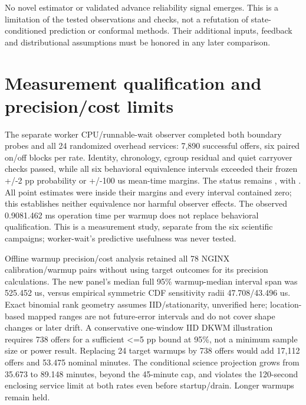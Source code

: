 \documentclass[11pt,a4paper]{article}
\begin{document}
No novel estimator or validated advance reliability signal emerges. This is
a limitation of the tested observations and checks, not a refutation of
state-conditioned prediction or conformal methods. Their additional inputs,
feedback and distributional assumptions must be honored in any later comparison.

\section{Measurement qualification and precision/cost limits}

The separate worker CPU/runnable-wait observer completed both boundary probes
and all 24 randomized overhead services: 7,890 successful offers, six paired
on/off blocks per rate. Identity, chronology, cgroup residual and quiet carryover
checks passed, while all six behavioral equivalence intervals exceeded their
frozen +/-2 pp probability or +/-100 us mean-time margins. The status remains
, with .
All point estimates were inside their margins and every interval contained zero;
this establishes neither equivalence nor harmful observer effects. The observed
0.908\textendash{}1.462 ms operation time per warmup does not replace behavioral qualification.
This is a measurement study, separate from the six scientific campaigns;
worker-wait's predictive usefulness was never tested.

Offline warmup precision/cost analysis retained all 78 NGINX calibration/warmup
pairs without using target outcomes for its precision calculations. The new
panel's median full 95\% warmup-median interval span was 525.452 us, versus
empirical symmetric CDF sensitivity radii 47.708/43.496 us. Exact binomial
rank geometry assumes IID/stationarity, unverified here; location-based mapped
ranges are not future-error intervals and do not cover shape changes or later
drift. A conservative one-window IID DKWM illustration requires 738 offers
for a sufficient <=5 pp bound at 95\%, not a minimum sample size or power result.
Replacing 24 target warmups by 738 offers would add 17,112 offers and 53.475
nominal minutes. The conditional science projection grows from 35.673 to
89.148 minutes, beyond the 45-minute cap, and violates the 120-second enclosing
service limit at both rates even before startup/drain. Longer warmups remain held.
\end{document}
